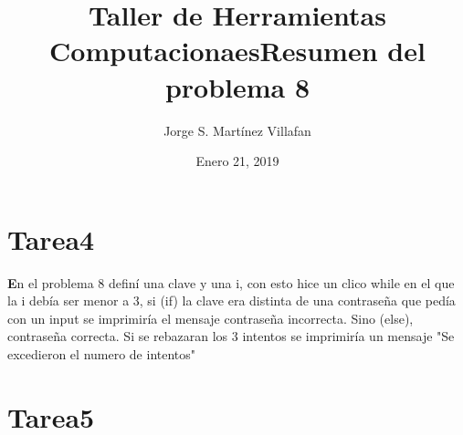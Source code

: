 \documentclass[letterpaper, 12pt, oneside]{article}%
\title{\Huge Taller de Herramientas Computacionaes}
\author{Jorge S. Martínez Villafan}
\date{Enero 21, 2019}
\begin{document}
\maketitle
\newpage
\title{Resumen del problema 8}
\section{Tarea4}
\textbf En el problema 8 definí una clave y una i, con esto hice un clico while en el que la i debía ser menor a 3, si (if) la clave era distinta de una contraseña que pedía con un input se imprimiría el mensaje contraseña incorrecta. Sino (else), contraseña correcta.
Si se rebazaran los 3 intentos se imprimiría un mensaje "Se excedieron el numero de intentos"

\section{Tarea5}
\end{document}
